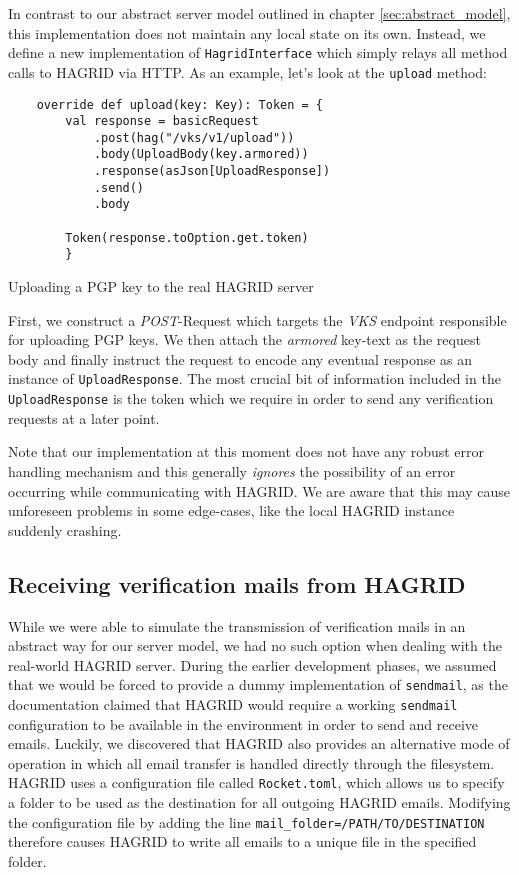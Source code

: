 In contrast to our abstract server model outlined in chapter \ref{sec:abstract_model}, this implementation does not maintain any local state on its own. Instead, we define a new implementation of \texttt{HagridInterface} which simply relays all method calls to HAGRID via HTTP. As an example, let's look at the \texttt{upload} method: 
\begin{code}
    \begin{verbatim}
    override def upload(key: Key): Token = {
        val response = basicRequest
            .post(hag("/vks/v1/upload"))
            .body(UploadBody(key.armored))
            .response(asJson[UploadResponse])
            .send()
            .body
    
        Token(response.toOption.get.token)
        }
    \end{verbatim}
    \caption{Uploading a PGP key to the real HAGRID server}
\end{code}
\label{code:hagrid_upload}
First, we construct a \emph{POST}-Request which targets the \emph{VKS} endpoint responsible for uploading PGP keys. We then attach the \emph{armored} key-text as the request body and finally instruct the request to encode any eventual response as an instance of \texttt{UploadResponse}.
The most crucial bit of information included in the \texttt{UploadResponse} is the token which we require in order to send any verification requests at a later point.

Note that our implementation at this moment does not have any robust error handling mechanism and this generally \emph{ignores} the possibility of an error occurring while communicating with HAGRID. We are aware that this may cause unforeseen problems in some edge-cases, like the local HAGRID instance suddenly crashing.

\subsection{Receiving verification mails from HAGRID}
While we were able to simulate the transmission of verification mails in an abstract way for our server model, we had no such option when dealing with the real-world HAGRID server. During the  earlier development phases, we assumed that we would be forced to provide a dummy implementation of \texttt{sendmail}, as the documentation claimed that HAGRID would require a working \texttt{sendmail} configuration to be available in the environment in order to send and receive emails.
Luckily, we discovered that HAGRID also provides an alternative mode of operation in which all email transfer is handled directly through the filesystem.
HAGRID uses a configuration file called \texttt{Rocket.toml}, which allows us to specify a folder to be used as the destination for all outgoing HAGRID emails.   
Modifying the configuration file by adding the line \texttt{mail_folder=/PATH/TO/DESTINATION} therefore causes HAGRID to write all emails to a unique file in the specified folder.

